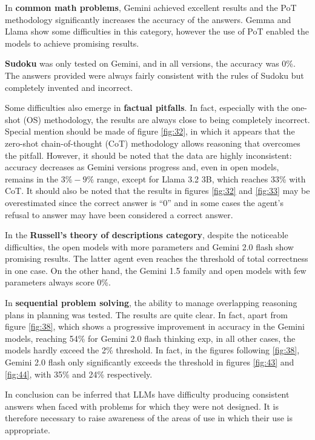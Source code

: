 \documentclass[12pt]{article}
\begin{document}
In \textbf{common math problems}, Gemini achieved excellent results and the PoT methodology significantly increases the accuracy of the answers. Gemma and Llama show some difficulties in this category, however the use of PoT enabled the models to achieve promising results.

\textbf{Sudoku} was only tested on Gemini, and in all versions, the accuracy was 0\%. The answers provided were always fairly consistent with the rules of Sudoku but completely invented and incorrect.

Some difficulties also emerge in \textbf{factual pitfalls}. In fact, especially with the one-shot (OS) methodology, the results are always close to being completely incorrect. Special mention should be made of figure \ref{fig:32}, in which it appears that the zero-shot chain-of-thought (CoT) methodology allows reasoning that overcomes the pitfall. However, it should be noted that the data are highly inconsistent: accuracy decreases as Gemini versions progress and, even in open models, remains in the $3\%-9\%$ range, except for Llama 3.2 3B, which reaches 33\% with CoT.
It should also be noted that the results in figures \ref{fig:32} and \ref{fig:33} may be overestimated since the correct answer is ``0'' and in some cases the agent's refusal to answer may have been considered a correct answer.

In the \textbf{Russell's theory of descriptions category}, despite the noticeable difficulties, the open models with more parameters and Gemini 2.0 flash show promising results. The latter agent even reaches the threshold of total correctness in one case. On the other hand, the Gemini 1.5 family and open models with few parameters always score 0\%.

In \textbf{sequential problem solving}, the ability to manage overlapping reasoning plans in planning was tested. The results are quite clear. In fact, apart from figure \ref{fig:38}, which shows a progressive improvement in accuracy in the Gemini models, reaching 54\% for Gemini 2.0 flash thinking exp, in all other cases, the models hardly exceed the 2\% threshold.
In fact, in the figures following \ref{fig:38}, Gemini 2.0 flash only significantly exceeds the threshold in figures \ref{fig:43} and \ref{fig:44}, with 35\% and 24\% respectively.

In conclusion can be inferred that LLMs have difficulty producing consistent answers when faced with problems for which they were not designed.
It is therefore necessary to raise awareness of the areas of use in which their use is appropriate.
\end{document}

